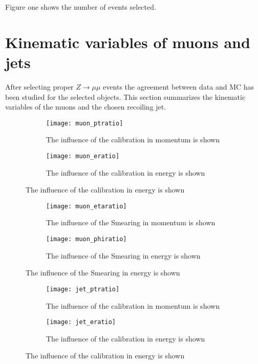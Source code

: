 Figure one shows the number of events selected. 

\section{Kinematic variables of muons and jets}

After selecting proper $Z \rightarrow \mu \mu$ events the agreement between data and MC has been studied for the selected objects. This section summarizes the kinematic variables of the muons and the chosen recoiling jet.

\begin{figure}[h]
\centering
\begin{subfigure}[b]{0.5\figwidth}
\texttt{[image: muon\_ptratio]}
\caption[Influence of the JES on the transversal momentum]{The influence of the calibration in momentum is shown}
\label{fig:muonpt}
\end{subfigure}
\quad
\begin{subfigure}[b]{0.5\figwidth}
\texttt{[image: muon\_eratio]}
\caption[Influence of the JES on the energy]{The influence of the calibration in energy is shown}
\label{fig:muone}
\end{subfigure}
\end{figure}


\begin{figure}[h]
\centering
\begin{subfigure}[b]{0.5\figwidth}
\texttt{[image: muon\_etaratio]}
\caption[Influence of the Smearing on the transversal momentum]{The influence of the Smearing in momentum is shown}
\label{fig:muoneta}
\end{subfigure}
\quad
\begin{subfigure}[b]{0.5\figwidth}
\texttt{[image: muon\_phiratio]}
\caption[Influence of the Smearing on the energy]{The influence of the Smearing in energy is shown}
\label{fig:muonphi}
\end{subfigure}
\end{figure}


\begin{figure}[h]
\centering
\begin{subfigure}[b]{0.5\figwidth}
\texttt{[image: jet\_ptratio]}
\caption[Influence of the JES on the transversal momentum]{The influence of the calibration in momentum is shown}
\label{fig:jetpt}
\end{subfigure}
\quad
\begin{subfigure}[b]{0.5\figwidth}
\texttt{[image: jet\_eratio]}
\caption[Influence of the JES on the energy]{The influence of the calibration in energy is shown}
\label{fig:jete}
\end{subfigure}
\end{figure}


